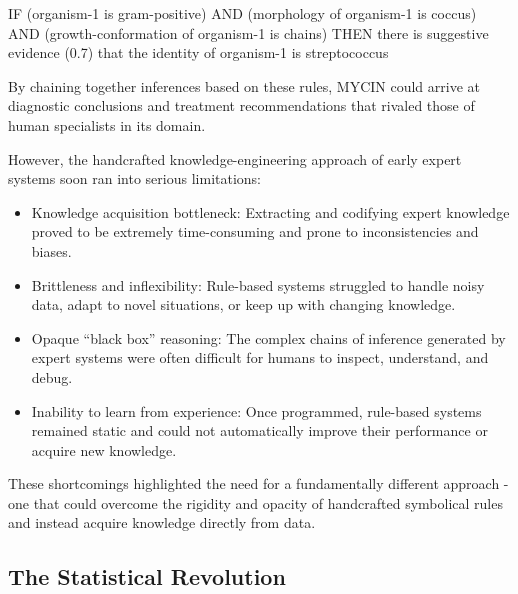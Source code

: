 \documentclass[
  9pt,
  letterpaper,
  abstract,
  titlepage]{scrbook}
\newenvironment{Shaded}{\begin{snugshade}}{\end{snugshade}}
\newcommand{\DataTypeTok}[1]{\textcolor[rgb]{0.68,0.00,0.00}{#1}}
\newcommand{\DecValTok}[1]{\textcolor[rgb]{0.68,0.00,0.00}{#1}}
\newcommand{\FloatTok}[1]{\textcolor[rgb]{0.68,0.00,0.00}{#1}}
\newcommand{\FunctionTok}[1]{\textcolor[rgb]{0.28,0.35,0.67}{#1}}
\newcommand{\NormalTok}[1]{\textcolor[rgb]{0.00,0.23,0.31}{#1}}
\begin{document}
\begin{Shaded}
\begin{Highlighting}[]
\DataTypeTok{IF}\NormalTok{ (organism}\DecValTok{{-}1} \DataTypeTok{is}\NormalTok{ gram}\DataTypeTok{{-}}\NormalTok{positive) }\DataTypeTok{AND} 
\NormalTok{   (morphology of organism}\DecValTok{{-}1} \DataTypeTok{is}\NormalTok{ coccus) }\DataTypeTok{AND}
\NormalTok{   (growth}\FunctionTok{{-}}\NormalTok{conformation of organism}\DecValTok{{-}1} \DataTypeTok{is}\NormalTok{ chains)}
\DataTypeTok{THEN}\NormalTok{ there }\DataTypeTok{is}\NormalTok{ suggestive evidence (}\FloatTok{0.7}\NormalTok{) that}
\NormalTok{     the identity of organism}\DecValTok{{-}1} \DataTypeTok{is}\NormalTok{ streptococcus}
\end{Highlighting}
\end{Shaded}

By chaining together inferences based on these rules, MYCIN could arrive
at diagnostic conclusions and treatment recommendations that rivaled
those of human specialists in its domain.

However, the handcrafted knowledge-engineering approach of early expert
systems soon ran into serious limitations:

\begin{itemize}
\item
  Knowledge acquisition bottleneck: Extracting and codifying expert
  knowledge proved to be extremely time-consuming and prone to
  inconsistencies and biases.
\item
  Brittleness and inflexibility: Rule-based systems struggled to handle
  noisy data, adapt to novel situations, or keep up with changing
  knowledge.
\item
  Opaque ``black box'' reasoning: The complex chains of inference
  generated by expert systems were often difficult for humans to
  inspect, understand, and debug.
\item
  Inability to learn from experience: Once programmed, rule-based
  systems remained static and could not automatically improve their
  performance or acquire new knowledge.
\end{itemize}

These shortcomings highlighted the need for a fundamentally different
approach - one that could overcome the rigidity and opacity of
handcrafted symbolical rules and instead acquire knowledge directly from
data.

\subsection{The Statistical
Revolution}\label{the-statistical-revolution}
\end{document}
